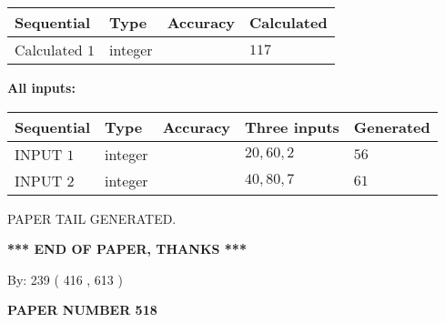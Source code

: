 \documentclass{ctexart}
\begin{document}
   
   
   
\noindent{}
   
   
  
  
\noindent\begin{tabular}{|l|l|l|l|}
\hline
 Sequential & Type & Accuracy & Calculated \\ 
\hline
 
 
  Calculated $  1 $ & integer &  & 
  $ 117 $ 
 \\  \hline  
 \end{tabular}
   
   
   
   
\noindent\vspace{0.1in}\hspace{-0.08in} {\textbf{\Large{All inputs: }}}
   
   
  
  
\noindent\begin{tabular}{|l|l|l|l|l|}
\hline
 Sequential & Type & Accuracy & Three inputs & Generated \\ 
\hline
 
 
  INPUT $  1 $ & integer &  & $
 20
 , 
 60
 , 
 2
 $ & $ 56 $ 
 \\  \hline  
 
 
  INPUT $  2 $ & integer &  & $
 40
 , 
 80
 , 
 7
 $ & $ 61 $ 
 \\  \hline  
 \end{tabular}
   
   
   
   
   
   
 \vspace{0.2in}
 
   
   
\vspace{2.0in} PAPER TAIL GENERATED.
   
   
   
   
\vspace{1.0in} 
{\textbf{\large{ *** END OF PAPER, THANKS *** }}} 
   
   
\hspace{1.0in} By: 
 239 ( 416 ,  613 )
   
   
   
   
\newpage 
\setcounter{page}{ 
   518001 } 
   
   
   
   
 {\textbf{ \Large{ PAPER NUMBER  518  }}}
   
\end{document}
